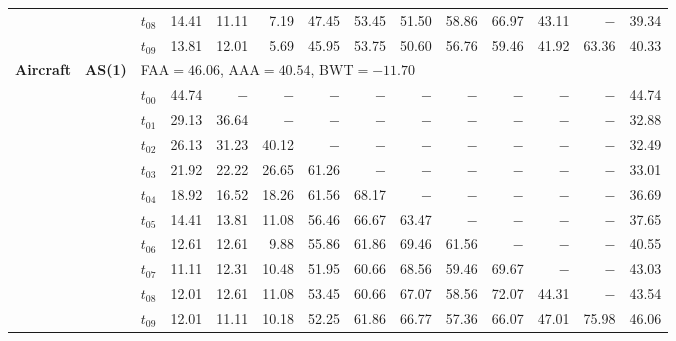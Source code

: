 \begin{table}[ht]
\begin{tabular}{@{}l l l *{11}{r}@{}}
 & & $t_{08}$ & 14.41 & 11.11 & 7.19 & 47.45 & 53.45 & 51.50 & 58.86 & 66.97 & 43.11 & $-$ & 39.34 \\
 & & $t_{09}$ & 13.81 & 12.01 & 5.69 & 45.95 & 53.75 & 50.60 & 56.76 & 59.46 & 41.92 & 63.36 & 40.33 \\
\midrule
\multirow{11}{*}{\textbf{Aircraft}} & \multirow{11}{*}{\textbf{AS(1)}} & \multicolumn{12}{l}{\quad\small FAA$=46.06$,\; AAA$=40.54$,\; BWT$=-11.70$} \\
 & & $t_{00}$ & 44.74 & $-$ & $-$ & $-$ & $-$ & $-$ & $-$ & $-$ & $-$ & $-$ & 44.74 \\
 & & $t_{01}$ & 29.13 & 36.64 & $-$ & $-$ & $-$ & $-$ & $-$ & $-$ & $-$ & $-$ & 32.88 \\
 & & $t_{02}$ & 26.13 & 31.23 & 40.12 & $-$ & $-$ & $-$ & $-$ & $-$ & $-$ & $-$ & 32.49 \\
 & & $t_{03}$ & 21.92 & 22.22 & 26.65 & 61.26 & $-$ & $-$ & $-$ & $-$ & $-$ & $-$ & 33.01 \\
 & & $t_{04}$ & 18.92 & 16.52 & 18.26 & 61.56 & 68.17 & $-$ & $-$ & $-$ & $-$ & $-$ & 36.69 \\
 & & $t_{05}$ & 14.41 & 13.81 & 11.08 & 56.46 & 66.67 & 63.47 & $-$ & $-$ & $-$ & $-$ & 37.65 \\
 & & $t_{06}$ & 12.61 & 12.61 & 9.88 & 55.86 & 61.86 & 69.46 & 61.56 & $-$ & $-$ & $-$ & 40.55 \\
 & & $t_{07}$ & 11.11 & 12.31 & 10.48 & 51.95 & 60.66 & 68.56 & 59.46 & 69.67 & $-$ & $-$ & 43.03 \\
 & & $t_{08}$ & 12.01 & 12.61 & 11.08 & 53.45 & 60.66 & 67.07 & 58.56 & 72.07 & 44.31 & $-$ & 43.54 \\
 & & $t_{09}$ & 12.01 & 11.11 & 10.18 & 52.25 & 61.86 & 66.77 & 57.36 & 66.07 & 47.01 & 75.98 & 46.06 \\
\bottomrule
\end{tabular}
\end{table}

